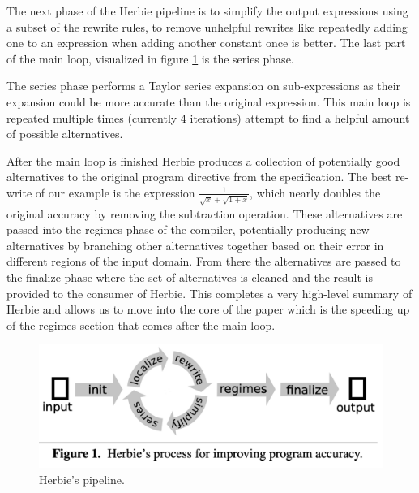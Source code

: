 \documentclass{article}
\begin{document}
The next phase of the Herbie pipeline is to simplify the output expressions using a subset of the rewrite rules, to remove unhelpful rewrites like repeatedly adding one to an expression when adding another constant once is better. The last part of the main loop, visualized in figure \ref{fig:herbie-pipeline} is the series phase. 

The series phase performs a Taylor series expansion on sub-expressions as their expansion could be more accurate than the original expression. This main loop is repeated multiple times (currently 4 iterations) attempt to find a helpful amount of possible alternatives. 

After the main loop is finished Herbie produces a collection of potentially good alternatives to the original program directive from the specification. The best re-write of our example is the expression $\frac{1}{\sqrt{x} + \sqrt{1 + x}}$, which nearly doubles the original accuracy by removing the subtraction operation. These alternatives are passed into the regimes phase of the compiler, potentially producing new alternatives by branching other alternatives together based on their error in different regions of the input domain. From there the alternatives are passed to the finalize phase where the set of alternatives is cleaned and the result is provided to the consumer of Herbie. This completes a very high-level summary of Herbie and allows us to move into the core of the paper which is the speeding up of the regimes section that comes after the main loop.

\begin{figure}[htbp]
\begin{center}
\includegraphics[scale=0.5]{herbie-pipeline.png}
\caption{Herbie's pipeline.}
\label{fig:herbie-pipeline}
\end{center}
\end{figure}
\end{document}
